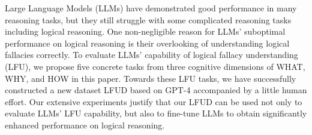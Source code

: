 Large Language Models (LLMs) have demonstrated good performance in many reasoning tasks, but they still struggle with some complicated reasoning tasks including logical reasoning. One non-negligible reason for LLMs' suboptimal performance on logical reasoning is their overlooking of understanding logical fallacies correctly. To evaluate LLMs' capability of logical fallacy understanding (LFU), we propose five concrete tasks from three cognitive dimensions of WHAT, WHY, and HOW in this paper. Towards these LFU tasks, we have successfully constructed a new dataset LFUD based on GPT-4 accompanied by a little human effort. Our extensive experiments justify that our LFUD can be used not only to evaluate LLMs' LFU capability, but also to fine-tune LLMs to obtain significantly enhanced performance on logical reasoning.